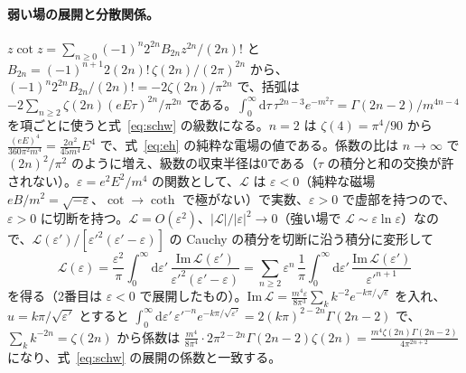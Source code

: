 \documentclass[a4paper,10pt]{ltjsarticle}
\newcommand{\dd}{\mathrm{d}}
\begin{document}
\paragraph{弱い場の展開と分散関係。}$z\cot z=\sum_{n\ge0}(-1)^n2^{2n}B_{2n}z^{2n}/(2n)!$ と $B_{2n}=(-1)^{n+1}2(2n)!\,\zeta(2n)/(2\pi)^{2n}$ から、$(-1)^n2^{2n}B_{2n}/(2n)!=-2\zeta(2n)/\pi^{2n}$ で、括弧は $-2\sum_{n\ge2}\zeta(2n)(eE\tau)^{2n}/\pi^{2n}$ である。$\int_0^\infty\dd\tau\,\tau^{2n-3}e^{-m^2\tau}=\Gamma(2n-2)/m^{4n-4}$ を項ごとに使うと式~\eqref{eq:schw} の級数になる。$n=2$ は $\zeta(4)=\pi^4/90$ から $\frac{(eE)^4}{360\pi^2m^4}=\frac{2\alpha^2}{45m^4}E^4$ で、式~\eqref{eq:eh} の純粋な電場の値である。係数の比は $n\to\infty$ で $(2n)^2/\pi^2$ のように増え、級数の収束半径は0である（$\tau$ の積分と和の交換が許されない）。$\varepsilon=e^2E^2/m^4$ の関数として、$\mathcal L$ は $\varepsilon<0$（純粋な磁場 $eB/m^2=\sqrt{-\varepsilon}$、$\cot\to\coth$ で極がない）で実数、$\varepsilon>0$ で虚部を持つので、$\varepsilon>0$ に切断を持つ。$\mathcal L=O(\varepsilon^2)$、$|\mathcal L|/|\varepsilon|^2\to0$（強い場で $\mathcal L\sim\varepsilon\ln\varepsilon$）なので、$\mathcal L(\varepsilon')/[\varepsilon'^2(\varepsilon'-\varepsilon)]$ の Cauchy の積分を切断に沿う積分に変形して
\begin{equation*}
\mathcal L(\varepsilon)=\frac{\varepsilon^2}{\pi}\int_0^\infty\dd\varepsilon'\,\frac{\mathrm{Im}\,\mathcal L(\varepsilon')}{\varepsilon'^2(\varepsilon'-\varepsilon)}
=\sum_{n\ge2}\varepsilon^n\,\frac1\pi\int_0^\infty\dd\varepsilon'\,\frac{\mathrm{Im}\,\mathcal L(\varepsilon')}{\varepsilon'^{n+1}}
\end{equation*}
を得る（2番目は $\varepsilon<0$ で展開したもの）。$\mathrm{Im}\,\mathcal L=\frac{m^4\varepsilon}{8\pi^3}\sum_kk^{-2}e^{-k\pi/\sqrt\varepsilon}$ を入れ、$u=k\pi/\sqrt{\varepsilon'}$ とすると $\int_0^\infty\dd\varepsilon'\,\varepsilon'^{-n}e^{-k\pi/\sqrt{\varepsilon'}}=2(k\pi)^{2-2n}\Gamma(2n-2)$ で、$\sum_kk^{-2n}=\zeta(2n)$ から係数は $\frac{m^4}{8\pi^4}\cdot2\pi^{2-2n}\Gamma(2n-2)\zeta(2n)=\frac{m^4\zeta(2n)\Gamma(2n-2)}{4\pi^{2n+2}}$ になり、式~\eqref{eq:schw} の展開の係数と一致する。
\end{document}
